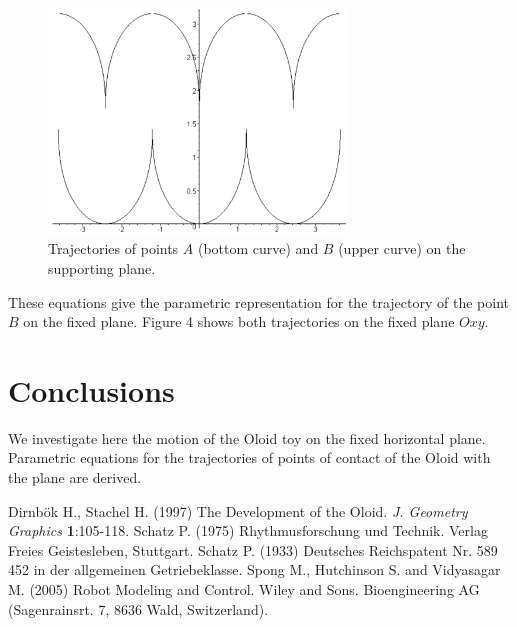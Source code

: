 \documentclass[10pt]{enoc2011}
\begin{document}
\begin{figure}[h]
\centering\includegraphics[height=6cm]{Oloid3}
\caption{Trajectories of points $A$ (bottom curve) and $B$ (upper curve) on the supporting plane.}
\end{figure}

These equations give the parametric representation for the trajectory of the point $B$ on the fixed plane. Figure 4 shows both trajectories on the fixed plane $Oxy$.

\section{Conclusions}
We investigate here the motion of the Oloid toy on the fixed horizontal plane. Parametric equations for the trajectories of points of contact of the Oloid with the plane are derived.

\begin{thebibliography}{99}
 Dirnb\"ok H., Stachel H. (1997) The Development of the Oloid.  {\em J. Geometry Graphics}
{\bf 1}:105-118.
 Schatz P. (1975) Rhythmusforschung und Technik. Verlag Freies Geistesleben, Stuttgart.
 Schatz P. (1933) Deutsches Reichspatent Nr. 589 452 in der allgemeinen Getriebeklasse.
 Spong M., Hutchinson S. and Vidyasagar M. (2005) Robot Modeling and Control. Wiley and Sons.
 Bioengineering AG (Sagenrainsrt. 7, 8636 Wald, Switzerland).
\end{thebibliography}
\end{document}
